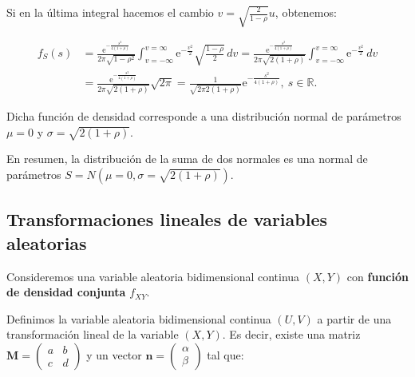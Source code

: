 \documentclass[]{book}
\begin{document}
Si en la última integral hacemos el cambio \(v=\sqrt{\frac{2}{1-\rho}}u\), obtenemos:

\[
\begin{array}{rl}
f_S(s)  & = \frac{\mathrm{e}^{-\frac{s^2}{4(1+\rho)}}}{2\pi\sqrt{1-\rho^2}}\int_{v=-\infty}^{v=\infty}\mathrm{e}^{-\frac{v^2}{2}} \sqrt{\frac{1-\rho}{2}}\, dv= \frac{\mathrm{e}^{-\frac{s^2}{4(1+\rho)}}}{2\pi\sqrt{2(1+\rho)}}\int_{v=-\infty}^{v=\infty}\mathrm{e}^{-\frac{v^2}{2}} \, dv \\ & = \frac{\mathrm{e}^{-\frac{s^2}{4(1+\rho)}}}{2\pi\sqrt{2(1+\rho)}} \sqrt{2\pi}= \frac{1}{\sqrt{2\pi 2(1+\rho)}}\mathrm{e}^{-\frac{s^2}{4(1+\rho)}},\ s\in\mathbb{R}.
\end{array}
\]

Dicha función de densidad corresponde a una distribución normal de parámetros \(\mu =0\) y \(\sigma = \sqrt{2(1+\rho)}\).

En resumen, la distribución de la suma de dos normales es una normal de parámetros \(S=N(\mu=0,\sigma = \sqrt{2(1+\rho)})\).

\hypertarget{transformaciones-lineales-de-variables-aleatorias}{%
\subsection{Transformaciones lineales de variables aleatorias}\label{transformaciones-lineales-de-variables-aleatorias}}

Consideremos una variable aleatoria bidimensional continua \((X,Y)\) con \textbf{función de densidad conjunta} \(f_{XY}\).

Definimos la variable aleatoria bidimensional continua \((U,V)\) a partir de una transformación lineal de la variable \((X,Y)\). Es decir, existe una matriz \(\mathbf{M}=\begin{pmatrix}a & b\\ c& d\end{pmatrix}\) y un vector \(\mathbf{n}=\begin{pmatrix}\alpha\\\beta \end{pmatrix}\) tal que:
\end{document}
